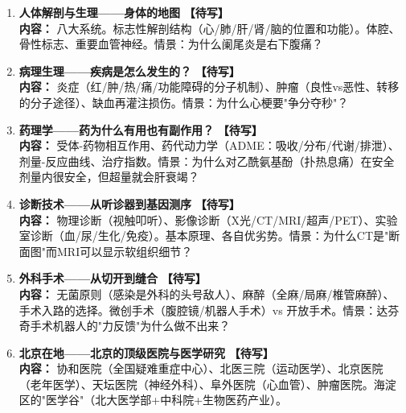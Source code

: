 \documentclass[a4paper,11pt]{ctexart}
\newcommand{\draft}{\textcolor{orange!80!black}{\textbf{【待写】}}}
\begin{document}
\begin{enumerate}
\item[\textbf{第1课}] \textbf{人体解剖与生理——身体的地图} \draft \\
\textbf{内容：} 八大系统。标志性解剖结构（心/肺/肝/肾/脑的位置和功能）。体腔、骨性标志、重要血管神经。情景：为什么阑尾炎是右下腹痛？
\item[\textbf{第2课}] \textbf{病理生理——疾病是怎么发生的？} \draft \\
\textbf{内容：} 炎症（红/肿/热/痛/功能障碍的分子机制）、肿瘤（良性vs恶性、转移的分子途径）、缺血再灌注损伤。情景：为什么心梗要"争分夺秒"？
\item[\textbf{第3课}] \textbf{药理学——药为什么有用也有副作用？} \draft \\
\textbf{内容：} 受体-药物相互作用、药代动力学（ADME：吸收/分布/代谢/排泄）、剂量-反应曲线、治疗指数。情景：为什么对乙酰氨基酚（扑热息痛）在安全剂量内很安全，但超量就会肝衰竭？
\item[\textbf{第4课}] \textbf{诊断技术——从听诊器到基因测序} \draft \\
\textbf{内容：} 物理诊断（视触叩听）、影像诊断（X光/CT/MRI/超声/PET）、实验室诊断（血/尿/生化/免疫）。基本原理、各自优劣势。情景：为什么CT是"断面图"而MRI可以显示软组织细节？
\item[\textbf{第5课}] \textbf{外科手术——从切开到缝合} \draft \\
\textbf{内容：} 无菌原则（感染是外科的头号敌人）、麻醉（全麻/局麻/椎管麻醉）、手术入路的选择。微创手术（腹腔镜/机器人手术）vs 开放手术。情景：达芬奇手术机器人的"力反馈"为什么做不出来？
\item[\textbf{第6课}] \textbf{北京在地——北京的顶级医院与医学研究} \draft \\
\textbf{内容：} 协和医院（全国疑难重症中心）、北医三院（运动医学）、北京医院（老年医学）、天坛医院（神经外科）、阜外医院（心血管）、肿瘤医院。海淀区的"医学谷"（北大医学部+中科院+生物医药产业）。
\end{enumerate}
\end{document}
